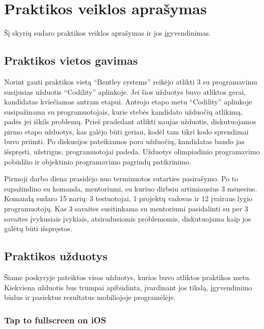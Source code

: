 \section{Praktikos veiklos aprašymas}
Šį skyrių sudaro praktikos veiklos aprašymas ir jos įgyvendinimas.

\subsection{Praktikos vietos gavimas}
Norint gauti praktikos vietą \enquote{Bentley systems} reikėjo atlikti 3 su programavimu susijusias užduotis \enquote{Codility} aplinkoje. Jei šios užduotys buvo atliktos gerai, kandidatas kviečiamas antram etapui. Antrojo etapo metu \enquote{Codility} aplinkoje susipažinama su programuotojais, kurie stebės kandidato užduočių atlikimą, padės jei iškils problemų. Prieš pradedant atlikti naujas užduotis, diskutuojamos pirmo etapo užduotys, kas galėjo būti geriau, kodėl tam tikri kodo sprendimai buvo priimti. Po diskusijos pateikiamos pora užduočių, kandidatas bando jas išspręsti, užstrigus, programuotojai padeda. Užduotys olimpiadinio programavimo pobūdžio ir objektinio programavimo pagrindų patikrinimo.

Pirmoji darbo diena prasidėjo nuo terminuotos sutarties pasirašymo. Po to supažindino su komanda, mentoriumi, su kuriuo dirbsiu artimiausius 3 mėnesius. Komandą sudaro 15 narių: 3 testuotojai, 1 projektų vadovas ir 12 įvairaus lygio programuotojų. Kas 3 savaites susitinkama su mentoriumi pasidalinti su per 3 savaites įvykusiais įvykiais, atsiradusiomis problemomis, diskutuojama kaip jos galėtų būti išspręstos.

\subsection{Praktikos užduotys}

Šiame poskyryje pateiktos visos užduotys, kurios buvo atliktos praktikos metu. Kiekviena užduotis bus trumpai apibūdinta, įvardinant jos tikslą, įgyvendinimo būdus ir pasiektus rezultatus mobiliojoje programėlėje.

\subsubsection{Tap to fullscreen on iOS}

